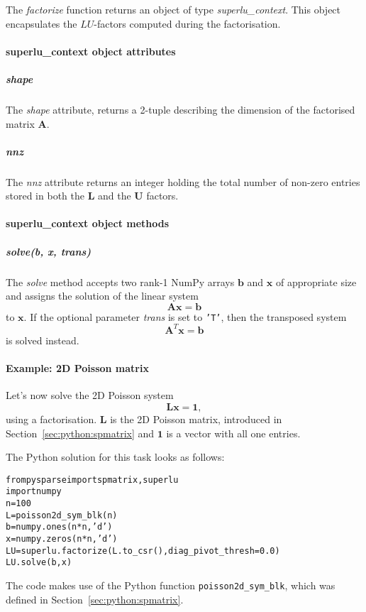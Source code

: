 \documentclass[a4paper]{article}
\newcommand{\mat}[1]{\ensuremath{\boldsymbol{#1}}}
\newcommand{\vect}[1]{\ensuremath{\mathbf{#1}}}
\newlength{\pyindent} \newlength{\pyminipagewidth}
\newenvironment{pycode}{\begin{trivlist}\item\hspace*{\pyindent}\begin{minipage}{\pyminipagewidth}\small\begin{alltt}}
      {\end{alltt}\end{minipage}\end{trivlist}}
\begin{document}
The \textit{factorize} function returns an object of type
\textit{superlu\_context}. This object encapsulates the $LU$-factors
computed during the factorisation.

\paragraph{superlu\_context object attributes}
%
\subparagraph{shape} 
%
The \textit{shape} attribute, returns a 2-tuple describing the
dimension of the factorised matrix $\mat{A}$.

\subparagraph{nnz}
%
The \textit{nnz} attribute returns an integer holding the total number
of non-zero entries stored in both the $\mat{L}$ and the $\mat{U}$
factors.

\paragraph{superlu\_context object methods}
%
\subparagraph{solve(b, x, trans)}
%
The \textit{solve} method accepts two rank-1 NumPy arrays $\vect{b}$
and $\vect{x}$ of appropriate size and assigns the solution of the
linear system
\begin{equation*}
  \mat{A}\vect{x} = \vect{b}
\end{equation*}
to $\vect{x}$. If the optional parameter \textit{trans} is set to
\texttt{'T'}, then the transposed system
\begin{equation*}
  \mat{A}^T\vect{x} = \vect{b}
\end{equation*}
is solved instead.

\paragraph{Example: 2D Poisson matrix}
%
Let's now solve the 2D Poisson system
\begin{equation*}
  \mat{L} \vect{x} = \vect{1},
\end{equation*}
using a factorisation. $\mat{L}$ is the 2D Poisson matrix, introduced
in Section~\ref{sec:python:spmatrix} and $\vect{1}$ is a vector with
all one entries.

\noindent The Python solution for this task looks as follows:
\begin{pycode}
from pysparse import spmatrix, superlu
import numpy 
n = 100
L = poisson2d_sym_blk(n)
b = numpy.ones(n*n, 'd')
x = numpy.zeros(n*n, 'd')
LU = superlu.factorize(L.to_csr(), diag_pivot_thresh=0.0)
LU.solve(b, x)
\end{pycode}
The code makes use of the Python function
\texttt{poisson2d\_sym\_blk}, which was defined in
Section~\ref{sec:python:spmatrix}.

\appendix

\end{document}
